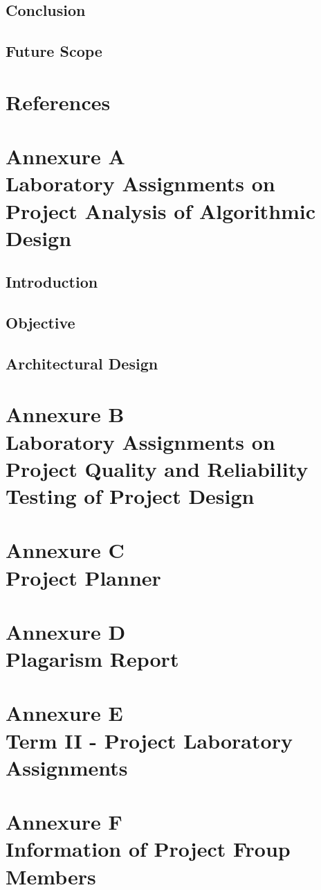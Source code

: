 \documentclass[a4paper, oneside, 12pt]{book}
\begin{document}
		\subsection{Conclusion}
		\subsection{Future Scope}
	\newpage
	\section{References}
	\newpage
		
		
	\newpage
	\section{Annexure A\\Laboratory Assignments on Project Analysis of Algorithmic Design}
	\newpage
		\subsection{Introduction}
		\subsection{Objective}
		\subsection{Architectural Design}
	\newpage
	\section{Annexure B\\Laboratory Assignments on Project Quality and Reliability Testing of Project Design}
	\newpage
	\section{Annexure C\\Project Planner}
	\newpage
	\section{Annexure D\\Plagarism Report}
	\newpage
	\section{Annexure E\\Term II - Project Laboratory Assignments}
	\newpage
	\section{Annexure F\\Information of Project Froup Members}
	\newpage
\end{document}
